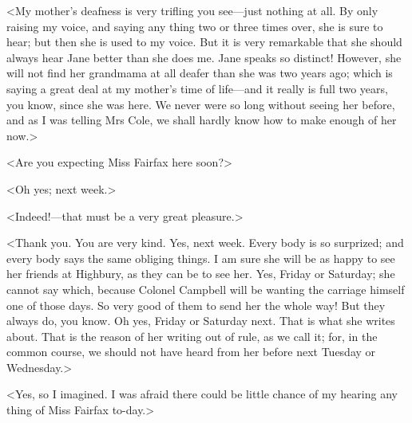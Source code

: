<My mother's deafness is very trifling you see—just nothing at all. By only raising my voice, and saying any thing two or three times over, she is sure to hear; but then she is used to my voice. But it is very remarkable that she should always hear Jane better than she does me. Jane speaks so distinct! However, she will not find her grandmama at all deafer than she was two years ago; which is saying a great deal at my mother's time of life—and it really is full two years, you know, since she was here. We never were so long without seeing her before, and as I was telling Mrs Cole, we shall hardly know how to make enough of her now.>

<Are you expecting Miss Fairfax here soon?>

<Oh yes; next week.>

<Indeed!—that must be a very great pleasure.>

<Thank you. You are very kind. Yes, next week. Every body is so surprized; and every body says the same obliging things. I am sure she will be as happy to see her friends at Highbury, as they can be to see her. Yes, Friday or Saturday; she cannot say which, because Colonel Campbell will be wanting the carriage himself one of those days. So very good of them to send her the whole way! But they always do, you know. Oh yes, Friday or Saturday next. That is what she writes about. That is the reason of her writing out of rule, as we call it; for, in the common course, we should not have heard from her before next Tuesday or Wednesday.>

<Yes, so I imagined. I was afraid there could be little chance of my hearing any thing of Miss Fairfax to-day.>

